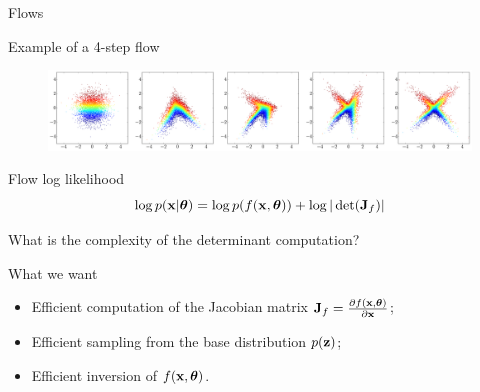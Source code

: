 \begin{frame}{Flows}
	\begin{block}{Example of a 4-step flow}
		\vspace{-0.2cm}
		\begin{figure}
			\includegraphics[width=\linewidth]{figs/flow_4_steps_example.png}
		\end{figure}
	\end{block}
	\vspace{-0.5cm}
	\begin{block}{Flow log likelihood}
		\vspace{-0.3cm}
		\[
		\log p(\mathbf{x}|\boldsymbol{\theta}) = \log p(f(\mathbf{x}, \boldsymbol{\theta})) + \log |\det ( \mathbf{J}_f)|
		\]
		\vspace{-0.3cm}
	\end{block}
	What is the complexity of the determinant computation?
	\begin{block}{What we want}
		\begin{itemize}
			\item Efficient computation of the Jacobian matrix $\mathbf{J}_f = \frac{\partial f(\mathbf{x}, \boldsymbol{\theta})}{\partial \mathbf{x}}$;
			\item Efficient sampling from the base distribution $p(\mathbf{z})$;
			\item Efficient inversion of $f(\mathbf{x}, \boldsymbol{\theta})$.
		\end{itemize}
	\end{block}
\end{frame}
